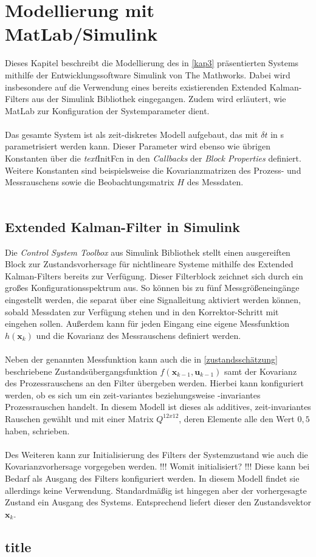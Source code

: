 \section{Modellierung mit MatLab/Simulink}
Dieses Kapitel beschreibt die Modellierung des in \ref{kap3} präsentierten Systems mithilfe der Entwicklungssoftware Simulink von The Mathworks. Dabei wird insbesondere auf die Verwendung eines bereits existierenden Extended Kalman-Filters aus der Simulink Bibliothek eingegangen. Zudem wird erläutert, wie MatLab zur Konfiguration der Systemparameter dient.\\\\
Das gesamte System ist als zeit-diskretes Modell aufgebaut, das mit $\delta t$ in s parametrisiert werden kann. Dieser Parameter wird ebenso wie übrigen Konstanten über die \textit{text}{InitFcn} in den \textit{Callbacks} der \textit{Block Properties} definiert. Weitere Konstanten sind beispielsweise die Kovarianzmatrizen des Prozess- und Messrauschens sowie die Beobachtungsmatrix $H$ des Messdaten.\\\\

\subsection{Extended Kalman-Filter in Simulink}
Die \textit{Control System Toolbox} aus Simulink Bibliothek stellt einen ausgereiften Block zur Zustandsvorhersage für nichtlineare Systeme mithilfe des Extended Kalman-Filters bereits zur Verfügung. Dieser Filterblock zeichnet sich durch ein großes Konfigurationsspektrum aus. So können bis zu fünf Messgrößeneingänge eingestellt werden, die separat über eine Signalleitung aktiviert werden können, sobald Messdaten zur Verfügung stehen und in den Korrektor-Schritt mit eingehen sollen. Außerdem kann für jeden Eingang eine eigene Messfunktion $h(\textbf{x}_k)$ und die Kovarianz des Messrauschens definiert werden.\\\\
Neben der genannten Messfunktion kann auch die in \ref{zustandsschätzung} beschriebene Zustandsübergangsfunktion $f(\textbf{x}_{k-1}, \textbf{u}_{k-1})$ samt der Kovarianz des Prozessrauschens an den Filter übergeben werden. Hierbei kann konfiguriert werden, ob es sich um ein zeit-variantes beziehungsweise -invariantes Prozessrauschen handelt. In diesem Modell ist dieses als additives, zeit-invariantes Rauschen gewählt und mit einer Matrix $Q^{12x12}$, deren Elemente alle den Wert $0,5$ haben, schrieben.\\\\
Des Weiteren kann zur Initialisierung des Filters der Systemzustand wie auch die Kovarianzvorhersage vorgegeben werden. !!! Womit initialisiert? !!! Diese kann bei Bedarf als Ausgang des Filters konfiguriert werden. In diesem Modell findet sie allerdings keine Verwendung. Standardmäßig ist hingegen aber der vorhergesagte Zustand ein Ausgang des Systems. Entsprechend liefert dieser den Zustandsvektor $\textbf{x}_k$.

\subsection{title}